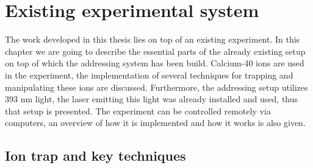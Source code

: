 
\chapter{Existing experimental system}
The work developed in this thesis lies on top of an existing experiment. In this chapter we are going to describe the essential parts of the already existing setup on top of which the addressing system has been build. Calcium-40 ions are used in the experiment, the implementation of several techniques for
trapping and manipulating these ions are discussed. Furthermore, the addressing setup utilizes 393 nm light, the laser emitting this light was already installed and used, thus that setup is presented. The experiment can be controlled remotely via computers, an overview of how it is implemented and how it works is also given.

\section{Ion trap and key techniques}
